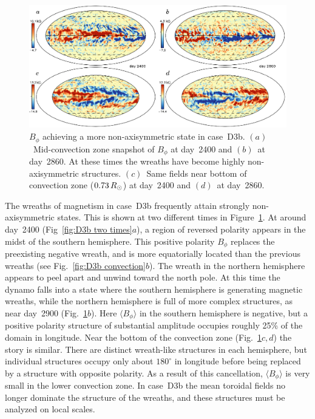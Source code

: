\begin{figure}[!t]
  \begin{center}
    \includegraphics[width=\linewidth]{figs/chapter_8/case_D3b_patterns.eps}
  \end{center}
  \caption[$B_\phi$ achieving a more non-axisymmetric state in case~D3b]
	  {$B_\phi$ achieving a more non-axisymmetric state in case~D3b.    
  $(a)$~Mid-convection zone snapshot of
  $B_\phi$ at day~2400 and $(b)$~at day~2860.  At these times the
  wreaths have become highly non-axisymmetric structures.  
  $(c)$~Same fields near bottom of convection zone ($0.73\thinspace R_\odot$) at
  day~2400 and $(d)$~at day~2860.
  \label{fig:D3b two times}}
\end{figure}

The wreaths of magnetism in case~D3b frequently attain strongly
non-axisymmetric states.  This is shown at two different times in
Figure~\ref{fig:D3b two times}.  At around day~2400 (Fig~\ref{fig:D3b
  two times}$a$), a region of reversed polarity appears in the midst of the southern
hemisphere.  This positive polarity $B_\phi$ replaces the preexisting
negative wreath, and is more equatorially located than the previous
wreaths (see Fig.~\ref{fig:D3b convection}$b$).  
The wreath in the northern hemisphere appears to peel apart and unwind
toward the north pole.  At this time the dynamo falls into a state
where the southern hemisphere is generating magnetic wreaths, while
the northern hemisphere is full of more complex structures, as near
day~2900 (Fig.~\ref{fig:D3b two times}$b$).  Here $\langle B_\phi
\rangle$ in the southern hemisphere is negative, but a positive
polarity structure of substantial amplitude occupies roughly 25\% of
the domain in longitude.  Near the bottom of the convection zone
(Fig.~\ref{fig:D3b two times}$c,d$) the story is similar.  There
are distinct wreath-like structures in each hemisphere, but individual
structures occupy only about $180^\circ$ in longitude before being
replaced by a structure with opposite polarity.  As a result of this
cancellation, $\langle B_\phi \rangle$ is very small in the lower convection zone.
In case~D3b the mean toroidal fields no longer dominate the structure
of the wreaths, and these structures must be analyzed on local scales. 



